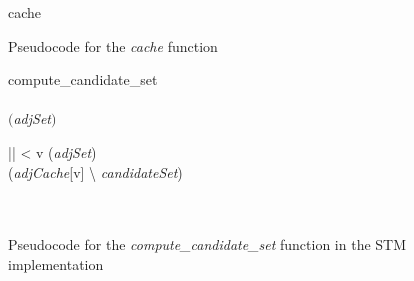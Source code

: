 \documentclass[10pt]{article}
\begin{document}
\begin{sloppypar}
\begin{center}
\begin{figure}
\begin{algorithm}{cache}{}
\\
\begin{FOR}{}
\end{FOR}
\end{algorithm}
\caption{Pseudocode for the \emph{cache} function}
\label{figure:cache}
\end{figure}
\end{center}

\begin{center}
\begin{figure}
\begin{algorithm}{compute\_candidate\_set}{}
 \\
 \\
$($\emph{adjSet}$)$ \\
\begin{WHILE}{ \neq \emptyset {} 
|| < }
v \leftarrow {}(\mbox{\emph{adjSet}}) \\
(\mbox{\emph{adjCache}}[v] \backslash
\mbox{\emph{candidateSet}}) \\
 \\
 \\
\end{WHILE}
\end{algorithm}
\caption{Pseudocode for the \emph{compute\_candidate\_set} function in
the STM implementation}
\label{figure:compute-cset-stm}
\end{figure}
\end{center}

%

\end{sloppypar}
\end{document}
